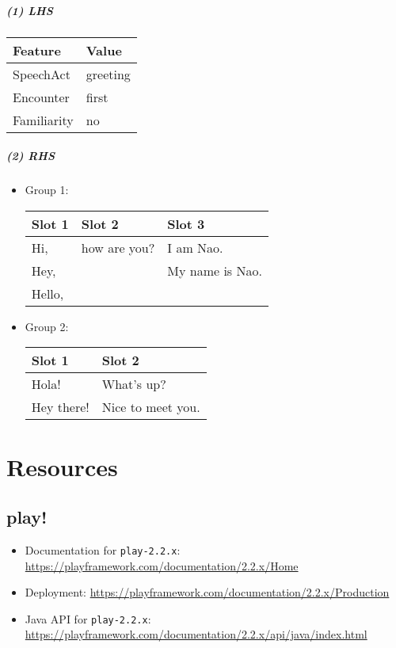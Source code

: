 \documentclass[11pt]{article}
\begin{document}
\subparagraph{(1) LHS}
\label{sec-3-4-1-4-1}
\begin{center}
\begin{tabular}{ll}
\hline
\textbf{Feature} & \textbf{Value}\\
\hline
SpeechAct & greeting\\
Encounter & first\\
Familiarity & no\\
\hline
\end{tabular}
\end{center}

\subparagraph{(2) RHS}
\label{sec-3-4-1-4-2}
\begin{itemize}
\item Group 1:

\begin{center}
\begin{tabular}{lll}
\hline
\textbf{Slot 1} & \textbf{Slot 2} & \textbf{Slot 3}\\
\hline
Hi, & how are you? & I am Nao.\\
Hey, &  & My name is Nao.\\
Hello, &  & \\
\hline
\end{tabular}
\end{center}

\item Group 2:

\begin{center}
\begin{tabular}{ll}
\hline
\textbf{Slot 1} & \textbf{Slot 2}\\
\hline
Hola! & What's up?\\
Hey there! & Nice to meet you.\\
\hline
\end{tabular}
\end{center}
\end{itemize}

\section{Resources}
\label{sec-4}
\subsection{play!}
\label{sec-4-1}
\begin{itemize}
\item Documentation for \texttt{play-2.2.x}:
\url{https://playframework.com/documentation/2.2.x/Home}
\item Deployment:
\url{https://playframework.com/documentation/2.2.x/Production}
\item Java API for \texttt{play-2.2.x}:
\url{https://playframework.com/documentation/2.2.x/api/java/index.html}
\end{itemize}
\end{document}
